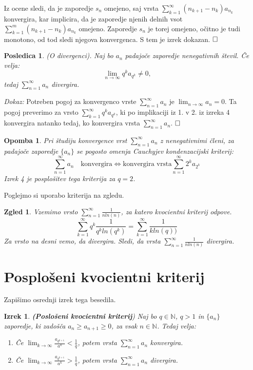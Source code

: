 \documentclass[a4paper,12pt]{article}
\def\N{\mathbb{N}} %
\def\qed{$\hfill\Box$}   %
\newtheorem{izrek}{Izrek}
\newtheorem{posledica}{Posledica}
\newtheorem{opomba}{Opomba}
\newtheorem{zgled}{Zgled}
\begin{document}
Iz ocene sledi, da je zaporedje ${s_n}$ omejeno, saj vrsta $\sum_{k = 1}^{\infty}{(n_{k+1} - n_k)a_{n_k}}$ konvergira, 
kar implicira, da je zaporedje njenih delnih vsot $\sum_{k = 1}^{m}{(n_{k+1} - n_k)a_{n_k}}$ omejeno.
Zaporedje ${s_n}$ je torej omejeno, očitno je tudi monotono, od tod sledi njegova konvergenca.
S tem je izrek dokazan.
\qed

\begin{posledica}(O divergenci).
    Naj bo $a_n$ padajoče zaporedje nenegativnih števil. Če velja:
    \[
        \lim_{n \to \infty}{q^ka_{q^k}} \neq 0 \text{,} 
    \]
    tedaj $\sum_{n = 1}^{\infty}{a_n}$ divergira.
\end{posledica}

\noindent
{\em Dokaz:\/}
Potreben pogoj za konvergenco vrste $\sum_{n = 1}^{\infty}{a_n}$ je
$\lim_{n \to \infty}{a_n} = 0$. Ta pogoj preverimo za vrsto $\sum_{k = 1}^{\infty}{q^ka_{q^k}}$,
ki po implikaciji iz 1. v 2. iz izreka 4 konvergira natanko tedaj, ko konvergira vrsta $\sum_{n = 1}^{\infty}{a_n}$.
\qed

\begin{opomba}
    Pri študiju konvergence vrst $\sum_{n = 1}^{\infty}{a_n}$ z nenegativnimi členi, 
    za padajoče zaporedje $\{a_n\}$ se pogosto omenja \emph{Cauchyjev kondenzacijski kriterij}:
    \[
        \sum_{n = 1}^{\infty}{a_n} \quad \text{konvergira} \iff \text{konvergira vrsta}
        \sum_{n = 1}^{\infty}{2^ka_{2^k}}
    \]
    Izrek 4 je posplošitev tega kriterija za $q = 2$.
\end{opomba}

\noindent
Poglejmo si uporabo kriterija na zgledu.
\begin{zgled}
    Vzemimo vrsto $\sum_{n = 1}^{\infty}{\frac{1}{nln(n)}}$, za katero kvocientni kriterij odpove.
    \[
        \sum_{k = 1}^{\infty}{q^k\frac{1}{q^kln(q^k)}} =
        \sum_{k = 1}^{\infty}{\frac{1}{kln(q))}}
    \]
    Za vrsto na desni vemo, da divergira. Sledi, da vrsta $\sum_{n = 1}^{\infty}{\frac{1}{nln(n)}}$ divergira.
\end{zgled}


\section{Posplošeni kvocientni kriterij}

Zapišimo osrednji izrek tega besedila.

\begin{izrek}\textbf{(Poslošeni kvocientni kriterij})
    Naj bo $q \in \N$, $q > 1$ in $\{a_n\}$ zaporedje,
    ki zadošča $a_{n} \geq a_{n+1} \geq 0$, za vsak $n \in \N$.
    Tedaj velja:
    
    \begin{enumerate}
        \item Če $\lim_{k \to \infty}{\frac{a_{q^{k + 1}}}{a^k}} < \frac{1}{q}$,
        potem vrsta $\sum_{n = 1}^{\infty}{a_n}$ konvergira.
        \item Če $\lim_{k \to \infty}{\frac{a_{q^{k + 1}}}{a^k}} > \frac{1}{q}$,
        potem vrsta $\sum_{n = 1}^{\infty}{a_n}$ divergira.
    \end{enumerate}
\end{izrek}
\end{document}
